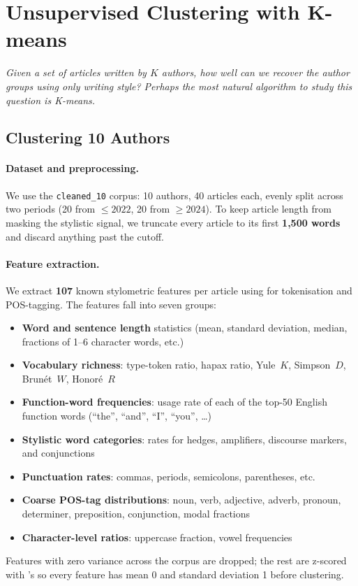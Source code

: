 \documentclass[11pt]{article}
\newcommand{\code}[1]{%
  \tcbox[on line, colback=codebg, colframe=codebg,
         boxrule=0pt, arc=2pt, left=2pt, right=2pt, top=0pt, bottom=0pt]
        {\ttfamily\small #1}}
\begin{document}
\section{Unsupervised Clustering with K-means}
\label{sec:kmeans}

\textit{Given a set of articles written by $K$ authors, how well can we recover
the author groups using only writing style? Perhaps the most natural algorithm
to study this question is K-means.}

\subsection{Clustering 10 Authors}

\paragraph{Dataset and preprocessing.}
We use the \texttt{cleaned\_10} corpus: 10 authors, 40 articles each, evenly
split across two periods (20 from $\leq 2022$, 20 from $\geq 2024$). To keep
article length from masking the stylistic signal, we truncate every article to
its first \textbf{1{,}500 words} and discard anything past the cutoff.

\paragraph{Feature extraction.}
We extract \textbf{107} known stylometric features per article using
\code{NLTK} for tokenisation and POS-tagging. The features fall into seven
groups:
\begin{itemize}\setlength\itemsep{1pt}
  \item \textbf{Word and sentence length} statistics (mean, standard deviation,
        median, fractions of 1--6 character words, etc.)
  \item \textbf{Vocabulary richness}: type-token ratio, hapax ratio, Yule~$K$,
        Simpson~$D$, Brun\'et~$W$, Honor\'e~$R$
  \item \textbf{Function-word frequencies}: usage rate of each of the top-50
        English function words (``the'', ``and'', ``I'', ``you'', \ldots)
  \item \textbf{Stylistic word categories}: rates for hedges, amplifiers,
        discourse markers, and conjunctions
  \item \textbf{Punctuation rates}: commas, periods, semicolons, parentheses, etc.
  \item \textbf{Coarse POS-tag distributions}: noun, verb, adjective, adverb,
        pronoun, determiner, preposition, conjunction, modal fractions
  \item \textbf{Character-level ratios}: uppercase fraction, vowel frequencies
\end{itemize}
Features with zero variance across the corpus are dropped; the rest are
z-scored with \code{sklearn}'s \code{StandardScaler} so every feature has mean
0 and standard deviation 1 before clustering.
\end{document}
